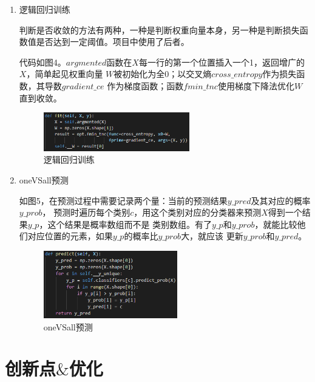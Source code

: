 \documentclass[UTF8,a4paper,12pt]{article}
\begin{document}
\begin{enumerate}[itemindent=0.5em,label=\arabic*、]
  \item 逻辑回归训练
  \par \qquad 判断是否收敛的方法有两种，一种是判断权重向量本身，另一种是判断损失函数值是否达到一定阈值。项目中使用了后者。
  \par \qquad 代码如图4。$argmented$函数在$X$每一行的第一个位置插入一个1，返回增广的$X$，简单起见权重向量
  $W$被初始化为全0；以交叉熵$cross\_entropy$作为损失函数，其导数$gradient\_ce$
  作为梯度函数；函数$fmin\_tnc$使用梯度下降法优化$W$直到收敛。
  \begin{figure}[h]
  \begin{center}
  \includegraphics[width=0.6\textwidth]{log_fit.png} %
  \caption{逻辑回归训练}
  \end{center}
  \end{figure}

  \item oneVSall预测
  \par \qquad 如图5，在预测过程中需要记录两个量：当前的预测结果$y\_pred$及其对应的概率$y\_prob$，
  预测时遍历每个类别$c$，用这个类别对应的分类器来预测$X$得到一个结果$y\_p$，这个结果是概率数组而不是
  类别数组。有了$y\_p$和$y\_prob$，就能比较他们对应位置的元素，如果$y\_p$的概率比$y\_prob$大，就应该
  更新$y\_prob$和$y\_pred$。
  \begin{figure}[h]
  \begin{center}
  \includegraphics[width=0.55\textwidth]{onevsall-predict.png} %
  \caption{oneVSall预测}
  \end{center}
  \end{figure}
\end{enumerate}

\section{创新点$\&$优化}
\end{document}
